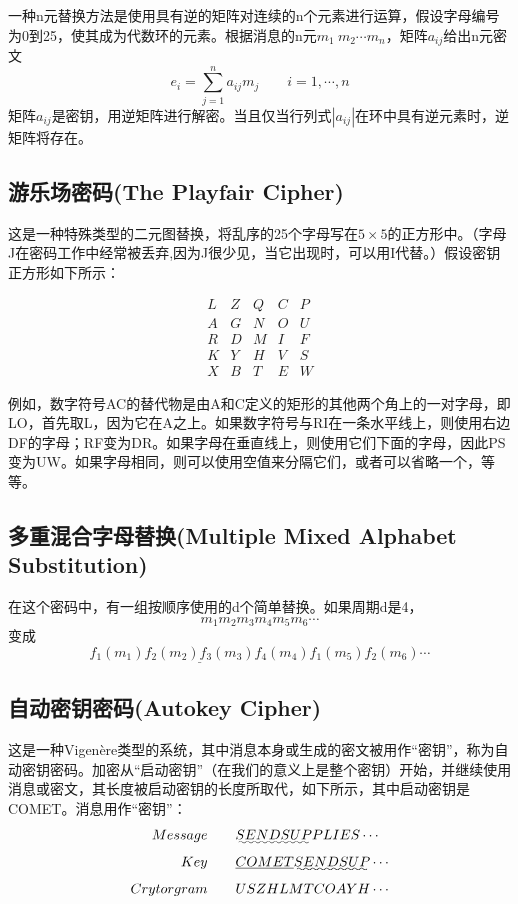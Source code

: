 \documentclass[]{article}
\begin{document}
一种n元替换方法是使用具有逆的矩阵对连续的n个元素进行运算，假设字母编号为0到25，使其成为代数环的元素。根据消息的n元$m_1\ m_2\cdots m_n$，矩阵$a_{ij}$给出n元密文
\[e_i=\sum_{j=1}^{n}a_{ij}m_j\qquad i=1,\cdots,n\]
矩阵$a_{ij}$是密钥，用逆矩阵进行解密。当且仅当行列式$|a_{ij}|$在环中具有逆元素时，逆矩阵将存在。


\subsection{游乐场密码(The Playfair Cipher)}

这是一种特殊类型的二元图替换，将乱序的25个字母写在$5\times 5$的正方形中。（字母J在密码工作中经常被丢弃,因为J很少见，当它出现时，可以用I代替。）假设密钥正方形如下所示：

\begin{equation}
	\begin{array}{ccccc}
	L &Z &Q &C &P\\
	A &G &N &O &U\\
	R &D &M &I &F\\
	K &Y &H &V &S\\
	X &B &T &E &W \nonumber
	\end{array} 
\end{equation}


例如，数字符号AC的替代物是由A和C定义的矩形的其他两个角上的一对字母，即LO，首先取L，因为它在A之上。如果数字符号与RI在一条水平线上，则使用右边DF的字母；RF变为DR。如果字母在垂直线上，则使用它们下面的字母，因此PS变为UW。如果字母相同，则可以使用空值来分隔它们，或者可以省略一个，等等。

\subsection{多重混合字母替换(Multiple Mixed Alphabet Substitution)}
在这个密码中，有一组按顺序使用的d个简单替换。如果周期d是4，
\[m_1m_2m_3m_4m_5m_6\cdots\]
变成
\[\underline{f_1(m_1)f_2(m_2)f_3(m_3)f_4(m_4)}f_1(m_5)f_2(m_6)\cdots\]


\subsection{自动密钥密码(Autokey Cipher)}

这是一种Vigen\`{e}re类型的系统，其中消息本身或生成的密文被用作“密钥”，称为自动密钥密码。加密从“启动密钥”（在我们的意义上是整个密钥）开始，并继续使用消息或密文，其长度被启动密钥的长度所取代，如下所示，其中启动密钥是COMET。消息用作“密钥”：
\begin{equation}
	\begin{aligned}
	Message\qquad    &\uwave{SENDSUP}PLIES\cdots \\
	Key\qquad        &\underline{COMET}\uwave{SENDSUP}\cdots \\
	Crytorgram\qquad &USZHLMTCOAYH\cdots \nonumber
	\end{aligned}
\end{equation}
\end{document}
